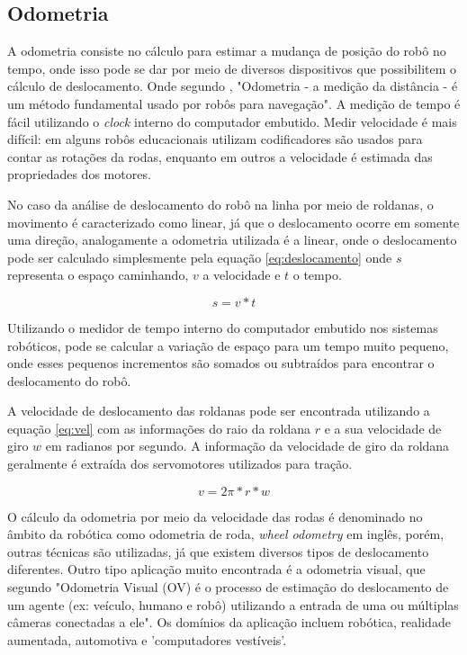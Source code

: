 \subsection{Odometria}\label{sec:odom}
A odometria consiste no cálculo para estimar a mudança de posição do robô no tempo, onde isso pode se dar por meio de diversos dispositivos que possibilitem o cálculo de deslocamento. Onde segundo \cite{ben2018robotic}, "Odometria - a medição da distância - é um método fundamental usado por robôs para navegação". A medição de tempo é fácil utilizando o \textit{clock} interno do computador embutido. Medir velocidade é mais difícil: em alguns robôs educacionais utilizam codificadores são usados para contar as rotações da rodas, enquanto em outros a velocidade é estimada das propriedades dos motores.

No caso da análise de deslocamento do robô na linha por meio de roldanas, o movimento é caracterizado como linear, já que o deslocamento ocorre em somente uma direção, analogamente a odometria utilizada é a linear, onde o deslocamento pode ser calculado simplesmente pela equação \ref{eq:deslocamento} onde $s$ representa o espaço caminhando, $v$ a velocidade e $t$ o tempo. 

\begin{equation}\label{eq:deslocamento}
s = v*t
\end{equation}

Utilizando o medidor de tempo interno do computador embutido nos sistemas robóticos, pode se calcular a variação de espaço para um tempo muito pequeno, onde esses pequenos incrementos são somados ou subtraídos para encontrar o deslocamento do robô.

A velocidade de deslocamento das roldanas pode ser encontrada utilizando a equação \ref{eq:vel} com as informações do raio da roldana $r$ e a sua velocidade de giro $w$ em radianos por segundo. A informação da velocidade de giro da roldana geralmente é extraída dos servomotores utilizados para tração.

\begin{equation}\label{eq:vel}
v = 2\pi*r*w
\end{equation}

O cálculo da odometria por meio da velocidade das rodas é denominado no âmbito da robótica como odometria de roda, \textit{wheel odometry} em inglês, porém, outras técnicas são utilizadas, já que existem diversos tipos de deslocamento diferentes. Outro tipo aplicação muito encontrada é a odometria visual, que segundo \cite{nister2004visual} "Odometria Visual (OV) é o processo de estimação do deslocamento de um agente (ex: veículo, humano e robô) utilizando a entrada de uma ou múltiplas câmeras conectadas a ele". Os domínios da aplicação incluem robótica, realidade aumentada, automotiva e 'computadores vestíveis'.

